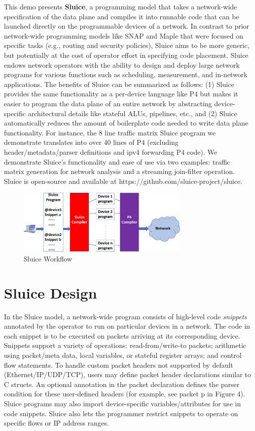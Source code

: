 This demo presents \textbf{Sluice}, a programming model that takes a
network-wide specification of the data plane and compiles it into runnable code
that can be launched directly on the programmable devices of a network. In
contrast to prior network-wide programming models like SNAP and Maple that were
focused on specific tasks (e.g., routing and security policies), Sluice aims to
be more generic, but potentially at the cost of operator effort in specifying code placement.
Sluice endows network operators with the ability to design and deploy large
network programs for various functions such as scheduling, measurement, and in-network applications.  The benefits of Sluice can be summarized as follows: (1) Sluice provides the same functionality as a per-device language like P4 but makes it easier to program the data plane of an entire network by abstracting device-specific architectural details like stateful ALUs, pipelines, etc., and (2) Sluice automatically reduces the amount of boilerplate code needed to write data plane functionality. For instance, the 8 line traffic matrix Sluice program we demonstrate translates into over 40 lines of P4 (excluding header/metadata/parser definitions and ipv4 forwarding P4 code). We demonstrate Sluice's functionality and ease of use via two examples: traffic matrix generation for network analysis and a streaming join-filter operation. Sluice is open-source and available at https://github.com/sluice-project/sluice.
\begin{figure}[tp]
\centering
\includegraphics[width=84mm,scale=0.7]{figures/sluice_workflow}
\caption{Sluice Workflow}
\vspace{-6mm}
\end{figure}
\vspace{-2mm}

\section{Sluice Design} \label{design}
In the Sluice model, a network-wide program consists of high-level code
\textit{snippets} annotated by the operator to run on particular devices in a
network. The code in each snippet is to be executed on packets arriving at its corresponding device. Snippets support a variety of operations:
read-from/write-to packets; arithmetic using packet/meta data, local variables, or
stateful register arrays; and control flow statements. To handle custom packet headers not supported by default (Ethernet/IP/UDP/TCP), users may
define packet header declarations similar to C structs. An optional annotation in the packet declaration defines the parser condition for these user-defined headers (for example, see packet p in Figure 4). Sluice programs may also import
device-specific variables/attributes for use in code snippets. Sluice also lets
the programmer restrict snippets to operate on specific flows or IP address
ranges.

